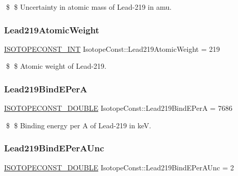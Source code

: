 \$ \$ Uncertainty in atomic mass of Lead-\/219 in amu. \mbox{\label{group___isotope_const-_lead-_pb219_ga2d34115dc7b39cf4086a03217e662f4f}} 
\subsubsection{\texorpdfstring{Lead219\+Atomic\+Weight}{Lead219AtomicWeight}}
{\footnotesize\ttfamily \mbox{\hyperlink{group___isotope_const-_macros_ga5f18360b3e99483a35c32d789e62621c}{I\+S\+O\+T\+O\+P\+E\+C\+O\+N\+S\+T\+\_\+\+I\+NT}} Isotope\+Const\+::\+Lead219\+Atomic\+Weight = 219}

\$ \$ Atomic weight of Lead-\/219. \mbox{\label{group___isotope_const-_lead-_pb219_ga986f11938e0250e040f45a1a2258f56f}} 
\subsubsection{\texorpdfstring{Lead219\+Bind\+E\+PerA}{Lead219BindEPerA}}
{\footnotesize\ttfamily \mbox{\hyperlink{group___isotope_const-_macros_ga8f45a7272ce02c0b4c65c44636ed719a}{I\+S\+O\+T\+O\+P\+E\+C\+O\+N\+S\+T\+\_\+\+D\+O\+U\+B\+LE}} Isotope\+Const\+::\+Lead219\+Bind\+E\+PerA = 7686}

\$ \$ Binding energy per A of Lead-\/219 in keV. \mbox{\label{group___isotope_const-_lead-_pb219_gadd908050b62657874bb33c7b9b22efcf}} 
\subsubsection{\texorpdfstring{Lead219\+Bind\+E\+Per\+A\+Unc}{Lead219BindEPerAUnc}}
{\footnotesize\ttfamily \mbox{\hyperlink{group___isotope_const-_macros_ga8f45a7272ce02c0b4c65c44636ed719a}{I\+S\+O\+T\+O\+P\+E\+C\+O\+N\+S\+T\+\_\+\+D\+O\+U\+B\+LE}} Isotope\+Const\+::\+Lead219\+Bind\+E\+Per\+A\+Unc = 2}

